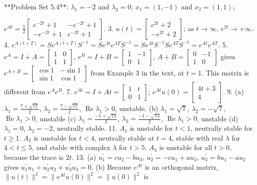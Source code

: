 **Problem Set 5.4**: \(\lambda_{1}=-2\) and \(\lambda_{2}=0\); \(x_{1}=(1,-1)\) and \(x_{2}=(1,1)\);

\(e^{At}=\frac{1}{2}\begin{bmatrix}e^{-2t}+1&-e^{-2t}+1\\ -e^{-2t}+1&e^{-2t}+1\end{bmatrix}\).
3. \(u(t)=\begin{bmatrix}e^{2t}+2\\ -e^{2t}+2\end{bmatrix}\); as \(t\to\infty\), \(e^{2t}\to+\infty\).
4. \(e^{A(t+T)}_{\cdot}=Se^{A(t+T)}S^{-1}=Se^{\Lambda t}e^{\Lambda T}S^{-1}=Se^{ \Lambda t}S^{-1}Se^{\Lambda T}S^{-1}=e^{At}e^{AT}\).
5. \(e^{A}=I+A=\begin{bmatrix}1&0\\ 1&1\end{bmatrix}\), \(e^{B}=I+B=\begin{bmatrix}1&-1\\ 0&1\end{bmatrix}\), \(A+B=\begin{bmatrix}0&-1\\ 1&0\end{bmatrix}\) gives \(e^{A+B}=\begin{bmatrix}\cos 1&-\sin 1\\ \sin 1&\cos 1\end{bmatrix}\) from Example 3 in the text, at \(t=1\). This matrix is different from \(e^{A}e^{B}\).
7. \(e^{At}=I+At=\begin{bmatrix}1&t\\ 0&1\end{bmatrix}\); \(e^{At}u(0)=\begin{bmatrix}4t+3\\ 4\end{bmatrix}\).
9. (a) \(\lambda_{1}=\frac{7+\sqrt{57}}{2}\), \(\lambda_{2}=\frac{7-\sqrt{57}}{2}\), \(\operatorname{Re}\lambda_{1}>0\), unstable. (b) \(\lambda_{1}=\sqrt{7}\), \(\lambda_{2}=-\sqrt{7}\), \(\operatorname{Re}\lambda_{1}>0\), unstable (c) \(\lambda_{1}=\frac{-1+\sqrt{13}}{2}\), \(\lambda_{2}=\frac{-1-\sqrt{13}}{2}\), \(\operatorname{Re}\lambda_{1}>0\), unstable (d) \(\lambda_{1}=0\), \(\lambda_{2}=-2\), neutrally stable.
11. \(A_{1}\) is unstable for \(t<1\), neutrally stable for \(t\geq 1\). \(A_{2}\) is unstable for \(t<4\), neutrally stable at \(t=4\), stable with real \(\lambda\) for \(4<t\leq 5\), and stable with complex \(\lambda\) for \(t>5\). \(A_{3}\) is unstable for all \(t>0\), because the trace is \(2t\).
13. (a) \(u^{\prime}_{1}=cu_{2}-bu_{3}\), \(u^{\prime}_{2}=-cu_{1}+au_{3}\), \(u^{\prime}_{3}=bu_{1}-au_{2}\) gives \(u^{\prime}_{1}u_{1}+u^{\prime}_{2}u_{2}+u^{\prime}_{3}u_{3}=0\). (b) Because \(e^{At}\) is an orthogonal matrix, \(\|u(t)\|^{2}=\|e^{At}u(0)\|^{2}=\|u(0)\|^{2}\) is 